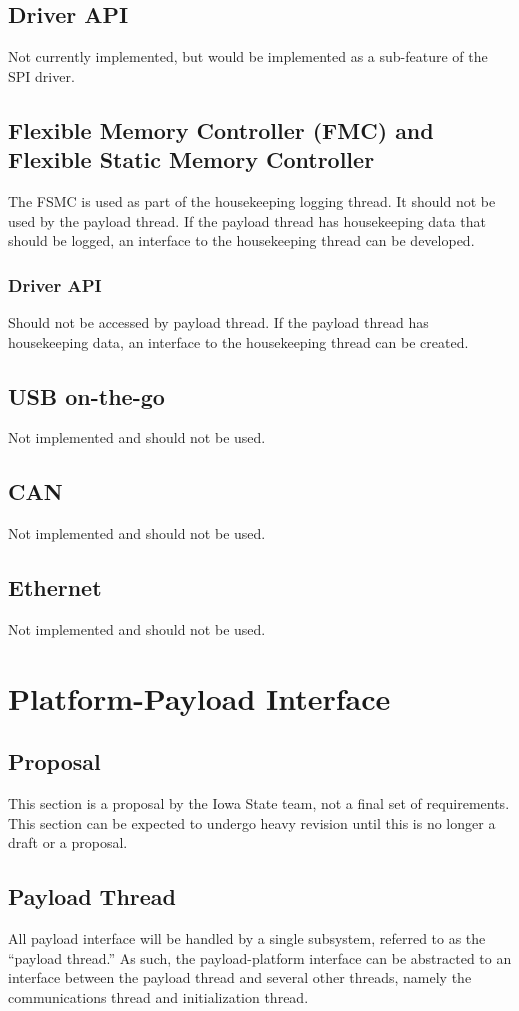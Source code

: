 \documentclass{article}
\begin{document}
\subsection{Driver API}
Not currently implemented, but would be implemented as a sub-feature of the 
SPI driver.

\subsection{Flexible Memory Controller (FMC) and Flexible Static Memory Controller}
The FSMC is used as part of the housekeeping logging thread. It should not be used by 
the payload thread. If the payload thread has housekeeping data that should be logged,
an interface to the housekeeping thread can be developed.
\subsubsection{Driver API}
Should not be accessed by payload thread. If the payload thread has housekeeping data,
an interface to the housekeeping thread can be created.

\subsection{USB on-the-go}
Not implemented and should not be used.

\subsection{CAN}
Not implemented and should not be used.

\subsection{Ethernet}
Not implemented and should not be used.

\section{Platform-Payload Interface}
\subsection{Proposal}
This section is a proposal by the Iowa State team, not
a final set of requirements. This section can be expected
to undergo heavy revision until this is no longer a draft or
a proposal.

\subsection{Payload Thread}
All payload interface will be handled by a single subsystem, referred to as the
``payload thread.'' As such, the payload-platform interface can be abstracted
to an interface between the payload thread and several other threads, namely
the communications thread and initialization thread.
\end{document}
